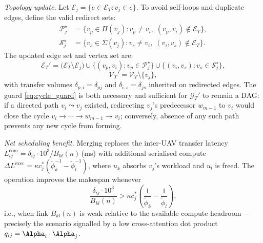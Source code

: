 \smallskip
\noindent\textit{Topology update.}
Let $\mathcal{E}_j = \{e \in \mathcal{E}_T : v_j \in e\}$.
To avoid self-loops and duplicate edges, define the valid redirect sets:
\begin{align}
  \mathcal{P}_j^{\star} &=
    \bigl\{v_p \in \Pi(v_j) : v_p \neq v_i,\;(v_p,v_i)\notin\mathcal{E}_T\bigr\},
  \label{eq:Pj}\\
  \mathcal{S}_j^{\star} &=
    \bigl\{v_s \in \Sigma(v_j) : v_s \neq v_i,\;(v_i,v_s)\notin\mathcal{E}_T\bigr\}.
  \label{eq:Sj}
\end{align}
The updated edge set and vertex set are:
\begin{equation}
  \mathcal{E}_T' =
    \bigl(\mathcal{E}_T \setminus \mathcal{E}_j\bigr)
    \cup \bigl\{(v_p,v_i): v_p\in\mathcal{P}_j^{\star}\bigr\}
    \cup \bigl\{(v_i,v_s): v_s\in\mathcal{S}_j^{\star}\bigr\},
  \label{eq:merge_edges}
\end{equation}
\begin{equation}
  \mathcal{V}_T' = \mathcal{V}_T \setminus \{v_j\},
  \label{eq:merge_vset}
\end{equation}
with transfer volumes $\delta_{p,i}=\delta_{pj}$ and
$\delta_{i,s}=\delta_{js}$ inherited on redirected edges.
The guard \eqref{eq:cycle_guard} is both necessary and sufficient
for $\mathcal{G}_T'$ to remain a DAG: if a directed path
$v_i\!\leadsto\!v_j$ existed, redirecting $v_j$'s predecessor
$w_{m-1}$ to $v_i$ would close the cycle
$v_i\!\to\!\cdots\!\to\!w_{m-1}\!\to\!v_i$;
conversely, absence of any such path prevents any new cycle from forming.

\smallskip
\noindent\textit{Net scheduling benefit.}
Merging replaces the inter-UAV transfer latency
$L_{ij}^{\mathrm{com}}=\delta_{ij}\cdot10^3/B_{kl}(n)$\,(ms)
with additional serialised compute
$\Delta L^{\mathrm{exec}}=\kappa c_j^*
  ({\tilde\phi_k^{-1}}-{\tilde\phi_l^{-1}})$,
where $u_k$ absorbs $v_j$'s workload and $u_l$ is freed.
The operation improves the makespan whenever
\begin{equation}
  \frac{\delta_{ij}\cdot 10^3}{B_{kl}(n)}
  > \kappa c_j^*\!\left(\frac{1}{\tilde\phi_k} - \frac{1}{\tilde\phi_l}\right),
  \label{eq:merge_benefit}
\end{equation}
i.e., when link $B_{kl}(n)$ is weak relative to the available compute
headroom—precisely the scenario signalled by a low cross-attention
dot product $q_{ij}=\boldsymbol{\Alpha}_i\cdot\boldsymbol{\Alpha}_j$.
